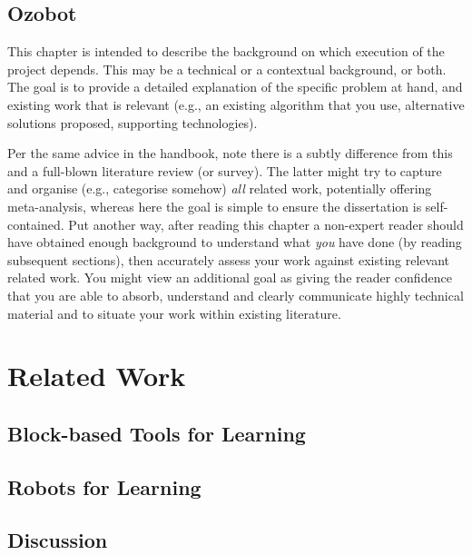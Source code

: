 \documentclass[oneside,%
                    author={Malak Hajji},
                    degree={BSc},
                    title={Designing An Accessible Computational Toolkit For Students},
                  subtitle={With Mixed Visual Abilities}]{dissertation}
\begin{document}
\subsubsection{}


\section{Ozobot}

\noindent
This chapter is intended to describe the background on which execution of the project depends. This may be a technical or a contextual background, or both. The goal is to provide a detailed explanation of the specific problem at hand, and existing work that is relevant (e.g., an existing algorithm that you use, alternative solutions proposed, supporting technologies).  

Per the same advice in the handbook, note there is a subtly difference from this and a full-blown literature review (or survey).  The latter might try to capture and organise (e.g., categorise somehow) \emph{all} related work, potentially offering meta-analysis, whereas here the goal is simple to ensure the dissertation is self-contained.  Put another way, after reading this chapter a non-expert reader should have obtained enough background to understand what \emph{you} have done (by reading subsequent sections), then accurately assess your work against existing relevant related work.  You might view an additional goal as giving the reader confidence that you are able to absorb, understand and clearly communicate highly technical material and to situate your work within existing literature.



\chapter{Related Work}
\label{chap:execution}

\section{Block-based Tools for Learning}
\section{Robots for Learning}
\section{Discussion} 
\end{document}
